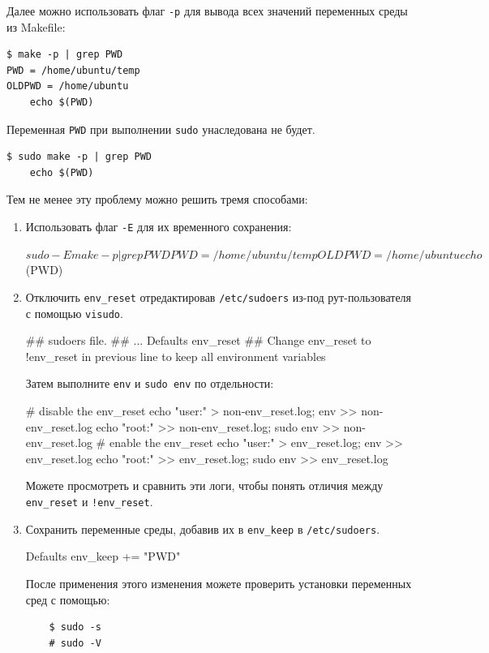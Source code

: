 \documentclass[10pt, oneside]{book}
\begin{document}

Далее можно использовать флаг \verb|-p| для вывода всех значений переменных среды из Makefile:

\begin{verbatim}
$ make -p | grep PWD
PWD = /home/ubuntu/temp
OLDPWD = /home/ubuntu
	echo $(PWD)
\end{verbatim}

Переменная \verb|PWD| при выполнении \verb|sudo| унаследована не будет.

\begin{verbatim}
$ sudo make -p | grep PWD
	echo $(PWD)
\end{verbatim}

Тем не менее эту проблему можно решить тремя способами:

\begin{enumerate}
  \item {
  Использовать флаг \verb|-E| для их временного сохранения:

  \begin{codebash}
    $ sudo -E make -p | grep PWD
    PWD = /home/ubuntu/temp
    OLDPWD = /home/ubuntu
    echo $(PWD)
  \end{codebash}
  }

  \item {
  Отключить \verb|env_reset| отредактировав \verb|/etc/sudoers| из-под рут-пользователя с помощью \verb|visudo|.

  \begin{code}
  ## sudoers file.
  ##
  ...
  Defaults env_reset
  ## Change env_reset to !env_reset in previous line to keep all environment variables
  \end{code}

  Затем выполните \verb|env| и \verb|sudo env| по отдельности:

  \begin{codebash}
    # disable the env_reset
    echo "user:" > non-env_reset.log; env >> non-env_reset.log
    echo "root:" >> non-env_reset.log; sudo env >> non-env_reset.log
    # enable the env_reset
    echo "user:" > env_reset.log; env >> env_reset.log
    echo "root:" >> env_reset.log; sudo env >> env_reset.log
  \end{codebash}

  Можете просмотреть и сравнить эти логи, чтобы понять отличия между \verb|env_reset| и \verb|!env_reset|.
  }

  \item {Сохранить переменные среды, добавив их в \verb|env_keep| в \verb|/etc/sudoers|.

  \begin{code}
  Defaults env_keep += "PWD"
  \end{code}

  После применения этого изменения можете проверить установки переменных сред с помощью:

  \begin{verbatim}
    $ sudo -s
    # sudo -V
  \end{verbatim}
  }
\end{enumerate}
\end{document}
